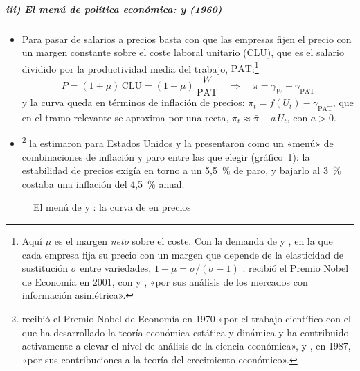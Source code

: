 \documentclass[11pt]{article}
\begin{document}
\subparagraph{iii) El menú de política económica:  y  (1960)}

\begin{itemize}
\item Para pasar de salarios a precios basta con que las empresas fijen el precio con un margen constante sobre el coste laboral unitario (CLU), que es el salario dividido por la productividad media del trabajo, $\mathrm{PAT}$:\footnote{Aquí $\mu$ es el margen \emph{neto} sobre el coste. Con la demanda de  y , en la que cada empresa fija su precio con un margen que depende de la elasticidad de sustitución $\sigma$ entre variedades, $1+\mu=\sigma/(\sigma-1)$ .  recibió el Premio Nobel de Economía en 2001, con  y , «por sus análisis de los mercados con información asimétrica»\nocite{Nobel2001AkerlofSpenceStiglitz}.}
  \begin{equation*}
  P=(1+\mu)\,\mathrm{CLU}=(1+\mu)\,\frac{W}{\mathrm{PAT}}\quad\Longrightarrow\quad\pi=\gamma_W-\gamma_{\mathrm{PAT}}
  \end{equation*}
  y la curva queda en términos de inflación de precios: $\pi_t=f(U_t)-\gamma_{\mathrm{PAT}}$, que en el tramo relevante se aproxima por una recta, $\pi_t\approx\bar\pi-a\,U_t$, con $a>0$.
\item \textcite{SamuelsonSolow1960Analytical}\footnote{ recibió el Premio Nobel de Economía en 1970 «por el trabajo científico con el que ha desarrollado la teoría económica estática y dinámica y ha contribuido activamente a elevar el nivel de análisis de la ciencia económica»\nocite{Nobel1970Samuelson}, y , en 1987, «por sus contribuciones a la teoría del crecimiento económico»\nocite{Nobel1987Solow}.} la estimaron para Estados Unidos y la presentaron como un «menú» de combinaciones de inflación y paro entre las que elegir (gráfico~\ref{fig:samuelson-solow}): la estabilidad de precios exigía en torno a un 5,5~\% de paro, y bajarlo al 3~\% costaba una inflación del 4,5~\% anual.
\end{itemize}

\begin{figure}[H]
\centering
\caption{El menú de  y : la curva de  en precios}\label{fig:samuelson-solow}
\end{figure}
\end{document}
